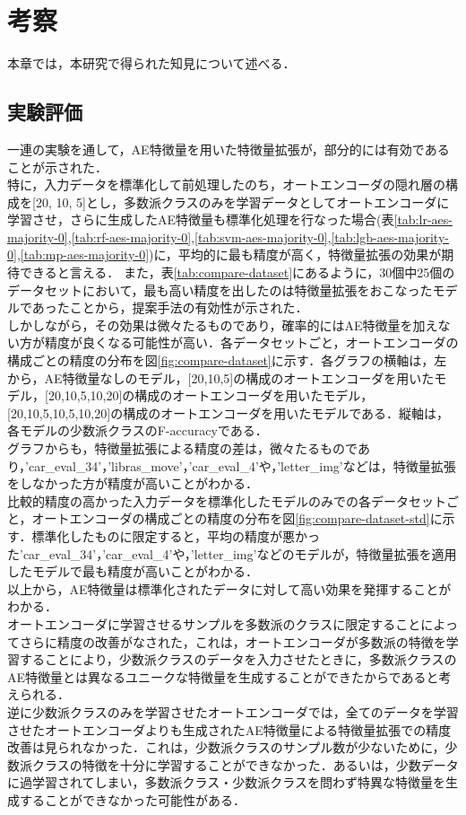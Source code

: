 \chapter{考察}
本章では，本研究で得られた知見について述べる．

\section{実験評価}
一連の実験を通して，AE特徴量を用いた特徴量拡張が，部分的には有効であることが示された．\\
特に，入力データを標準化して前処理したのち，オートエンコーダの隠れ層の構成を[20, 10, 5]とし，多数派クラスのみを学習データとしてオートエンコーダに学習させ，さらに生成したAE特徴量も標準化処理を行なった場合(表\ref{tab:lr-aes-majority-0},\ref{tab:rf-aes-majority-0},\ref{tab:svm-aes-majority-0},\ref{tab:lgb-aes-majority-0},\ref{tab:mp-aes-majority-0})に，平均的に最も精度が高く，特徴量拡張の効果が期待できると言える．
また，表\ref{tab:compare-dataset}にあるように，30個中25個のデータセットにおいて，最も高い精度を出したのは特徴量拡張をおこなったモデルであったことから，提案手法の有効性が示された．\\
しかしながら，その効果は微々たるものであり，確率的にはAE特徴量を加えない方が精度が良くなる可能性が高い．各データセットごと，オートエンコーダの構成ごとの精度の分布を図\ref{fig:compare-dataset}に示す．各グラフの横軸は，左から，AE特徴量なしのモデル，[20,10,5]の構成のオートエンコーダを用いたモデル，[20,10,5,10,20]の構成のオートエンコーダを用いたモデル，[20,10,5,10,5,10,20]の構成のオートエンコーダを用いたモデルである．縦軸は，各モデルの少数派クラスのF-accuracyである．\\
グラフからも，特徴量拡張による精度の差は，微々たるものであり，'car\_eval\_34'，'libras\_move'，'car\_eval\_4'や，'letter\_img'などは，特徴量拡張をしなかった方が精度が高いことがわかる．\\

比較的精度の高かった入力データを標準化したモデルのみでの各データセットごと，オートエンコーダの構成ごとの精度の分布を図\ref{fig:compare-dataset-std}に示す．標準化したものに限定すると，平均の精度が悪かった'car\_eval\_34'，'car\_eval\_4'や，'letter\_img'などのモデルが，特徴量拡張を適用したモデルで最も精度が高いことがわかる．\\
以上から，AE特徴量は標準化されたデータに対して高い効果を発揮することがわかる．\\

オートエンコーダに学習させるサンプルを多数派のクラスに限定することによってさらに精度の改善がなされた，これは，オートエンコーダが多数派の特徴を学習することにより，少数派クラスのデータを入力させたときに，多数派クラスのAE特徴量とは異なるユニークな特徴量を生成することができたからであると考えられる．\\
逆に少数派クラスのみを学習させたオートエンコーダでは，全てのデータを学習させたオートエンコーダよりも生成されたAE特徴量による特徴量拡張での精度改善は見られなかった．これは，少数派クラスのサンプル数が少ないために，少数派クラスの特徴を十分に学習することができなかった．あるいは，少数データに過学習されてしまい，多数派クラス・少数派クラスを問わず特異な特徴量を生成することができなかった可能性がある．\\




